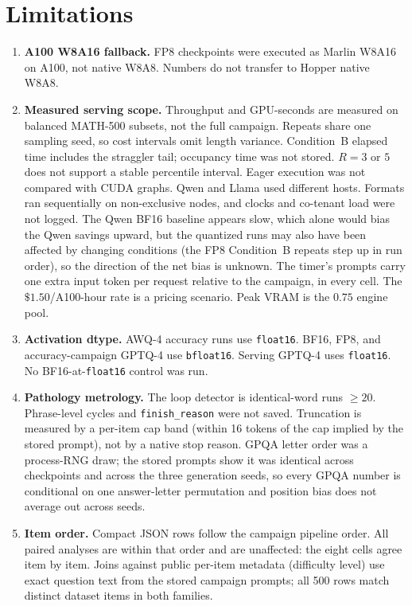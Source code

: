 \documentclass[11pt,a4paper]{article}
\begin{document}
\section{Limitations}
\begin{enumerate}
    \item \textbf{A100 W8A16 fallback.} FP8 checkpoints were executed as Marlin W8A16 on A100, not native W8A8. Numbers do not transfer to Hopper native W8A8.
    \item \textbf{Measured serving scope.} Throughput and GPU-seconds are measured on balanced MATH-500 subsets, not the full campaign. Repeats share one sampling seed, so cost intervals omit length variance. Condition~B elapsed time includes the straggler tail; occupancy time was not stored. $R=3$ or $5$ does not support a stable percentile interval. Eager execution was not compared with CUDA graphs. Qwen and Llama used different hosts. Formats ran sequentially on non-exclusive nodes, and clocks and co-tenant load were not logged. The Qwen BF16 baseline appears slow, which alone would bias the Qwen savings upward, but the quantized runs may also have been affected by changing conditions (the FP8 Condition~B repeats step up in run order), so the direction of the net bias is unknown. The timer's prompts carry one extra input token per request relative to the campaign, in every cell. The $\$1.50$/A100-hour rate is a pricing scenario. Peak VRAM is the $0.75$ engine pool.
    \item \textbf{Activation dtype.} AWQ-4 accuracy runs use \texttt{float16}. BF16, FP8, and accuracy-campaign GPTQ-4 use \texttt{bfloat16}. Serving GPTQ-4 uses \texttt{float16}. No BF16-at-\texttt{float16} control was run.
    \item \textbf{Pathology metrology.} The loop detector is identical-word runs $\ge 20$. Phrase-level cycles and \texttt{finish\_reason} were not saved. Truncation is measured by a per-item cap band (within 16 tokens of the cap implied by the stored prompt), not by a native stop reason. GPQA letter order was a process-RNG draw; the stored prompts show it was identical across checkpoints and across the three generation seeds, so every GPQA number is conditional on one answer-letter permutation and position bias does not average out across seeds.
    \item \textbf{Item order.} Compact JSON rows follow the campaign pipeline order. All paired analyses are within that order and are unaffected: the eight cells agree item by item. Joins against public per-item metadata (difficulty level) use exact question text from the stored campaign prompts; all 500 rows match distinct dataset items in both families.

\end{enumerate}
\end{document}
